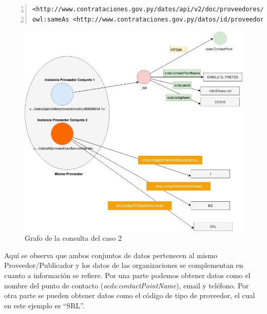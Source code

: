 \noindent\begin{minipage}[c]{\textwidth}
    \begin{lstlisting}[captionpos=b, caption=Declaracion de igualdad semantica de dos instancias, label=lst:caso2-1,  numbers=left,  numberstyle=\tiny\color{mygray},frame=single]
<http://www.contrataciones.gov.py/datos/api/v2/doc/proveedores/ruc/80008004-1> 
owl:sameAs <http://www.contrataciones.gov.py/datos/id/proveedores/fax-comtel-srl>  .

     \end{lstlisting}
\end{minipage}
     \begin{figure}[ht!]
        \centering
        \includegraphics[width=150mm]{figuras/Diagramas-Caso2.png}
        \caption{Grafo de la consulta del caso 2}
        \label{img:DiagramaCaso2}
     \end{figure}

     Aquí se observa que ambos conjuntos de datos pertenecen al mismo Proveedor/Publicador y los datos de las organizaciones se complementan en cuanto a información se refiere. Por una parte podemos obtener datos como el nombre del punto de contacto (\textit{ocds:contactPointName}), email y teléfono. Por otra parte se pueden obtener datos como el código de tipo de proveedor, el cual en este ejemplo es “SRL”. 

    
